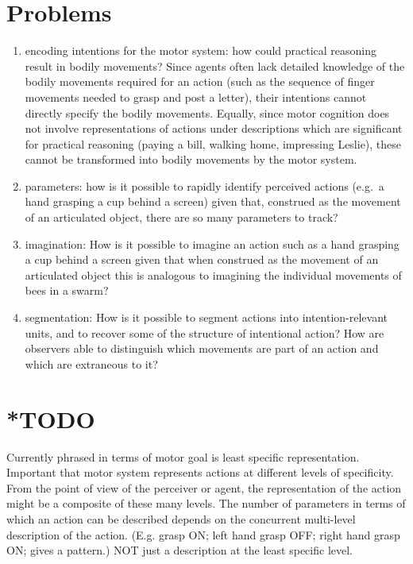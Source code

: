 \documentclass[12pt,a4paper]{extarticle}
\begin{document}
\section{Problems}
\begin{enumerate}

\item encoding intentions for the motor system: how could practical reasoning result in bodily movements?  
Since agents often lack detailed knowledge of the bodily movements required for an action (such as the sequence of finger movements needed to grasp and post a letter), their intentions cannot directly specify the bodily movements.  
Equally, since motor cognition does not involve representations of actions under descriptions which are significant for practical reasoning (paying a bill, walking home, impressing Leslie), these cannot be transformed into bodily movements by the motor system.

\item parameters: how is it possible to rapidly identify perceived actions (e.g.\ a hand grasping a cup behind a screen) given that, construed as the movement of an articulated object, there are so many parameters to track?

\item imagination: How is it possible to imagine an action such as a hand grasping a cup behind a screen given that when construed as the movement of an articulated object this is analogous to imagining the individual movements of bees in a swarm?

\item segmentation: How is it possible to segment  actions into intention-relevant units, and to recover some of the structure of intentional action?  How are observers able to distinguish which movements are part of an action and which are extraneous to it?

\end{enumerate}



\section{*TODO}

Currently phrased in terms of motor goal is least specific representation.
Important that motor system represents actions at different levels of specificity.
From the point of view of the perceiver or agent, the representation of the action might be a composite of these many levels.
The number of parameters in terms of which an action can be described depends on the concurrent multi-level description of the action.  (E.g. grasp ON; left hand grasp OFF; right hand grasp ON; gives a pattern.)
NOT just a description at the least specific level.
\end{document}
